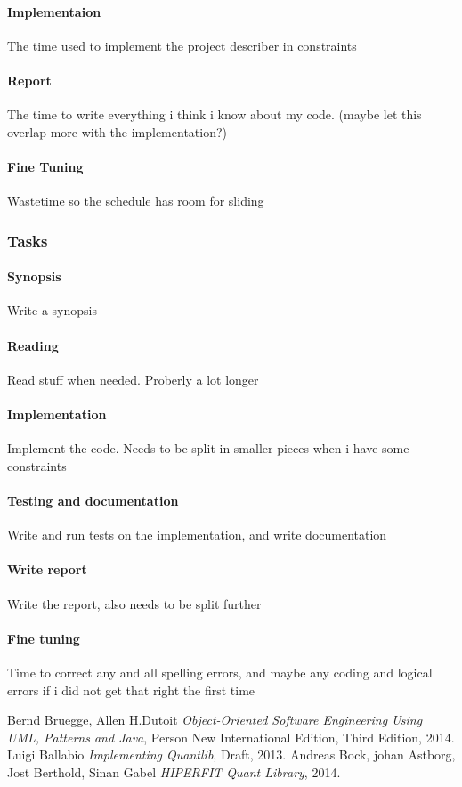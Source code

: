 \paragraph{Implementaion}
The time used to implement the project describer in constraints

\paragraph{Report}
The time to write everything i think i know about my code. (maybe let this
overlap more with the implementation?)

\paragraph{Fine Tuning}
Wastetime so the schedule has room for sliding

\subsubsection{Tasks}

\paragraph{Synopsis}
Write a synopsis
\paragraph{Reading}
Read stuff when needed. Proberly a lot longer
\paragraph{Implementation}
Implement the code. Needs to be split in smaller
pieces when i have some constraints
\paragraph{Testing and documentation}
Write and run tests on the implementation, and
write documentation
\paragraph{Write report}
Write the report, also needs to be split further
\paragraph{Fine tuning}
Time to correct any and all spelling errors, and maybe 
any coding and logical errors if i did not get that right
the first time

\begin{thebibliography}{9}
    Bernd Bruegge, Allen H.Dutoit
    \emph{Object-Oriented Software Engineering Using UML, Patterns and Java},
    Person New International Edition,
    Third Edition,
    2014.
    Luigi Ballabio
    \emph{Implementing Quantlib},
    Draft,
    2013.
    Andreas Bock, johan Astborg, Jost Berthold, Sinan Gabel
    \emph{HIPERFIT Quant Library},
    2014.
\end{thebibliography}


